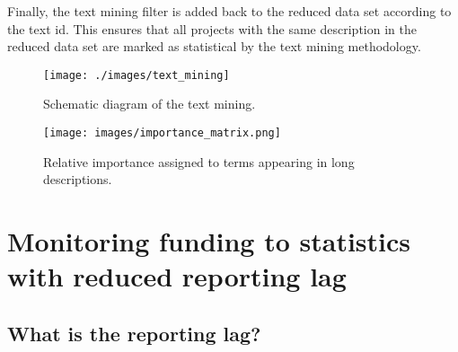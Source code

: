 \documentclass[
]{article}
\newenvironment{Shaded}{\begin{snugshade}}{\end{snugshade}}
\newcommand{\AttributeTok}[1]{\textcolor[rgb]{0.77,0.63,0.00}{#1}}
\newcommand{\CommentTok}[1]{\textcolor[rgb]{0.56,0.35,0.01}{\textit{#1}}}
\newcommand{\ConstantTok}[1]{\textcolor[rgb]{0.00,0.00,0.00}{#1}}
\newcommand{\FunctionTok}[1]{\textcolor[rgb]{0.00,0.00,0.00}{#1}}
\newcommand{\NormalTok}[1]{#1}
\newcommand{\OtherTok}[1]{\textcolor[rgb]{0.56,0.35,0.01}{#1}}
\newcommand{\SpecialCharTok}[1]{\textcolor[rgb]{0.00,0.00,0.00}{#1}}
\begin{document}
\begin{enumerate}
\begin{enumerate}
\begin{Shaded}
\end{Shaded}
  \end{enumerate}
\end{enumerate}

Finally, the text mining filter is added back to the reduced data set according to the text id. This ensures that all projects with the same description in the reduced data set are marked as statistical by the text mining methodology.

\begin{figure}

{\centering \texttt{[image: ./images/text\_mining]} 

}

\caption{Schematic diagram of the text mining.}\label{fig:text-mining}
\end{figure}

\begin{figure}[H]
  \centering
  \texttt{[image: images/importance\_matrix.png]}
  \caption{Relative importance assigned to terms appearing in long descriptions.}
  \label{fig:importance-matrix}
\end{figure}

\hypertarget{monitoring-funding-to-statistics-with-reduced-reporting-lag}{%
\section{Monitoring funding to statistics with reduced reporting lag}\label{monitoring-funding-to-statistics-with-reduced-reporting-lag}}

\hypertarget{what-is-the-reporting-lag}{%
\subsection{What is the reporting lag?}\label{what-is-the-reporting-lag}}
\end{document}
